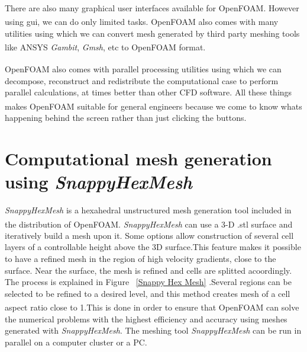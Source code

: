  

There are also many graphical user interfaces available for OpenFOAM\textsuperscript{\textregistered}. However using gui, we can do only limited tasks. OpenFOAM\textsuperscript{\textregistered} also comes with many utilities using which we can convert mesh generated by third party meshing tools like ANSYS\textsuperscript{\textregistered} \textit{Gambit}, \textit{Gmsh}, etc to OpenFOAM\textsuperscript{\textregistered} format.

OpenFOAM\textsuperscript{\textregistered} also comes with parallel processing utilities using which we can decompose, reconstruct and redistribute the computational case to perform parallel calculations, at times better than other CFD software. All these things makes OpenFOAM\textsuperscript{\textregistered} suitable for general engineers because we come to know whats happening behind the screen rather than just clicking the buttons. 


\section{Computational mesh generation using \textit{SnappyHexMesh}}

\textit{SnappyHexMesh} is a hexahedral unstructured mesh generation tool included in the distribution of OpenFOAM\textsuperscript{\textregistered}. \textit{SnappyHexMesh} can use a 3-D .stl surface and iteratively build a mesh upon it. Some options allow construction of several cell layers of a controllable height above the 3D surface.This feature makes it possible to have a refined mesh in the region of high velocity gradients, close to the surface.  Near the surface, the mesh is refined and cells are splitted acoordingly. The process is explained in Figure ~\ref{Snappy Hex Mesh} .Several regions can be selected to be refined to a desired level, and this method creates mesh of a cell aspect ratio close to 1.This is done in order to ensure that OpenFOAM\textsuperscript{\textregistered} can solve the numerical problems with the highest efficiency and accuracy using meshes generated with \textit{SnappyHexMesh}. The meshing tool \textit{SnappyHexMesh} can be run in parallel on a computer cluster or a PC.


